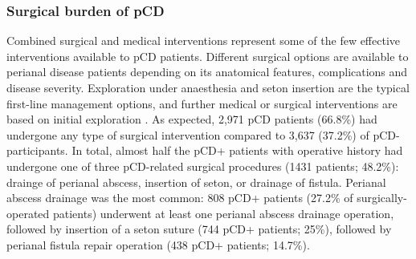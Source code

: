 




    \subsubsection{Surgical burden of pCD}

    Combined surgical and medical interventions represent some of the few effective interventions available to pCD patients. Different surgical options are available to perianal disease patients depending on its anatomical features, complications and disease severity. Exploration under anaesthesia and seton insertion are the typical first-line management options, and further medical or surgical interventions are based on initial exploration \cite{Adegbola2018-ha}. As expected, 2,971 pCD patients (66.8\%) had undergone any type of surgical intervention compared to 3,637 (37.2\%) of pCD- participants. In total, almost half the pCD+ patients with operative history had undergone one of three pCD-related surgical procedures (1431 patients; 48.2\%): drainge of perianal abscess, insertion of seton, or drainage of fistula. Perianal abscess drainage was the most common: 808 pCD+ patients (27.2\% of surgically-operated patients) underwent at least one perianal abscess drainage operation, followed by insertion of a seton suture (744 pCD+ patients; 25\%), followed by perianal fistula repair operation (438 pCD+ patients; 14.7\%).

